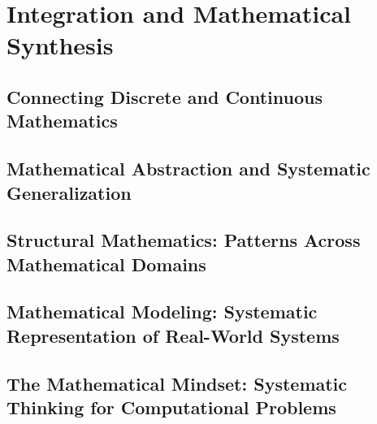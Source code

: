 

\chapter{Integration and Mathematical Synthesis}

\section{Connecting Discrete and Continuous Mathematics}

\section{Mathematical Abstraction and Systematic Generalization}

\section{Structural Mathematics: Patterns Across Mathematical Domains}

\section{Mathematical Modeling: Systematic Representation of Real-World Systems}

\section{The Mathematical Mindset: Systematic Thinking for Computational Problems}
